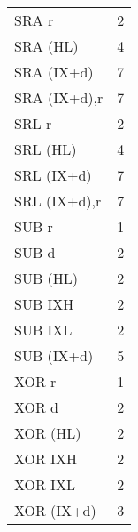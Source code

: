 \begin{ttfamily}
\begin{multicols}{3}
\begin{tabular}{lc}
SRA r       & 2 \\
SRA (HL)    & 4 \\
SRA (IX+d)    & 7 \\
SRA (IX+d),r   & 7 \\

SRL r       & 2 \\
SRL (HL)    & 4 \\
SRL (IX+d)    & 7 \\
SRL (IX+d),r   & 7 \\

SUB r         & 1 \\
SUB d         & 2 \\
SUB (HL) & 2\\
SUB IXH & 2 \\
SUB IXL & 2 \\
SUB (IX+d) & 5 \\

XOR r       & 1 \\
XOR d       & 2 \\
XOR (HL)    & 2 \\
XOR IXH     & 2 \\
XOR IXL     & 2 \\
XOR (IX+d)  & 3 \\

\end{tabular}



\end{multicols}
\end{ttfamily}
